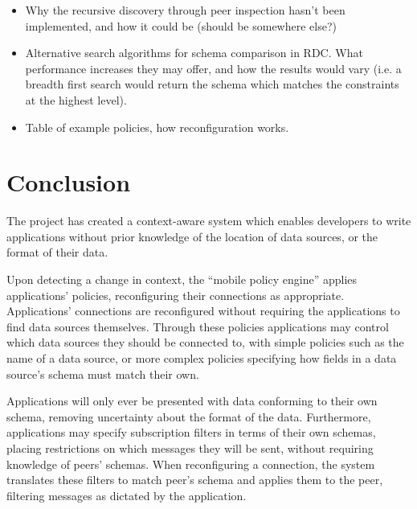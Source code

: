 \documentclass[12pt,twoside,notitlepage]{report}
\begin{document}
\begin{itemize}
\item Why the recursive discovery through peer inspection hasn't been implemented, and how it could be (should be somewhere else?)

\item Alternative search algorithms for schema comparison in RDC. What performance increases they may offer, and how the results would vary (i.e. a breadth first search would return the schema which matches the constraints at the highest level).

\item Table of example policies, how reconfiguration works.
\end{itemize}


\cleardoublepage

\chapter{Conclusion}

The project has created a context-aware system which enables developers to write applications without prior knowledge of the location of data sources, or the format of their data. 

Upon detecting a change in context, the ``mobile policy engine'' applies applications' policies, reconfiguring their connections as appropriate. 
Applications' connections are reconfigured without requiring the applications to find data sources themselves.
Through these policies applications may control which data sources they should be connected to, with simple policies such as the name of a data source, or more complex policies specifying how fields in a data source's schema must match their own.

Applications will only ever be presented with data conforming to their own schema, removing uncertainty about the format of the data.
Furthermore, applications may specify subscription filters in terms of their own schemas, placing restrictions on which messages they will be sent, without requiring knowledge of peers' schemas.
When reconfiguring a connection, the system translates these filters to match peer's schema and applies them to the peer, filtering messages as dictated by the application.
\end{document}
